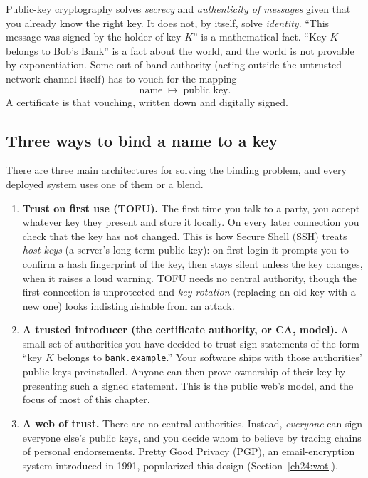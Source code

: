 \begin{intuitionbox}
Public-key cryptography solves \emph{secrecy} and \emph{authenticity of messages} given that you already know the right key. It does not, by itself, solve \emph{identity}. ``This message was signed by the holder of key $K$'' is a mathematical fact. ``Key $K$ belongs to Bob's Bank'' is a fact about the world, and the world is not provable by exponentiation. Some out-of-band authority (acting outside the untrusted network channel itself) has to vouch for the mapping
\[
\text{name} \;\longmapsto\; \text{public key}.
\]
A certificate is that vouching, written down and digitally signed.
\end{intuitionbox}

\subsection{Three ways to bind a name to a key}

There are three main architectures for solving the binding problem, and every deployed system uses one of them or a blend.

\begin{enumerate}
\item \textbf{Trust on first use (TOFU).} The first time you talk to a party, you accept whatever key they present and store it locally. On every later connection you check that the key has not changed. This is how Secure Shell (SSH) treats \emph{host keys} (a server's long-term public key): on first login it prompts you to confirm a hash fingerprint of the key, then stays silent unless the key changes, when it raises a loud warning. TOFU needs no central authority, though the first connection is unprotected and \emph{key rotation} (replacing an old key with a new one) looks indistinguishable from an attack.
\item \textbf{A trusted introducer (the certificate authority, or CA, model).} A small set of authorities you have decided to trust sign statements of the form ``key $K$ belongs to \texttt{bank.example}.'' Your software ships with those authorities' public keys preinstalled. Anyone can then prove ownership of their key by presenting such a signed statement. This is the public web's model, and the focus of most of this chapter.
\item \textbf{A web of trust.} There are no central authorities. Instead, \emph{everyone} can sign everyone else's public keys, and you decide whom to believe by tracing chains of personal endorsements. Pretty Good Privacy (PGP), an email-encryption system introduced in 1991, popularized this design (Section~\ref{ch24:wot}).
\end{enumerate}

